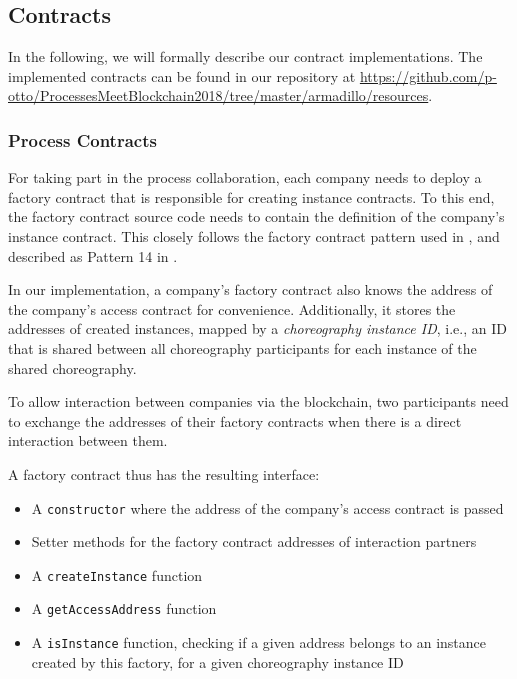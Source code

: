 \documentclass[runningheads]{llncs}
\begin{document}
\subsection{Contracts}

In the following, we will formally describe our contract implementations.
The implemented contracts can be found in our repository at \url{https://github.com/p-otto/ProcessesMeetBlockchain2018/tree/master/armadillo/resources}.

\subsubsection{Process Contracts}

For taking part in the process collaboration, each company needs to deploy a factory contract that is responsible for creating instance contracts.
To this end, the factory contract source code needs to contain the definition of the company's instance contract.
This closely follows the factory contract pattern used in \cite{weber2016untrusted}, and described as Pattern 14 in \cite{xu2018pattern}.

In our implementation, a company's factory contract also knows the address of the company's access contract for convenience.
Additionally, it stores the addresses of created instances, mapped by a \textit{choreography instance ID}, i.e., an ID that is shared between all choreography participants for each instance of the shared choreography.

To allow interaction between companies via the blockchain, two participants need to exchange the addresses of their factory contracts when there is a direct interaction between them.

A factory contract thus has the resulting interface:
\begin{itemize}
	\item A \texttt{constructor} where the address of the company's access contract is passed
	\item Setter methods for the factory contract addresses of interaction partners
	\item A \texttt{createInstance} function
	\item A \texttt{getAccessAddress} function
	\item A \texttt{isInstance} function, checking if a given address belongs to an instance created by this factory, for a given choreography instance ID %
\end{itemize}
\end{document}
